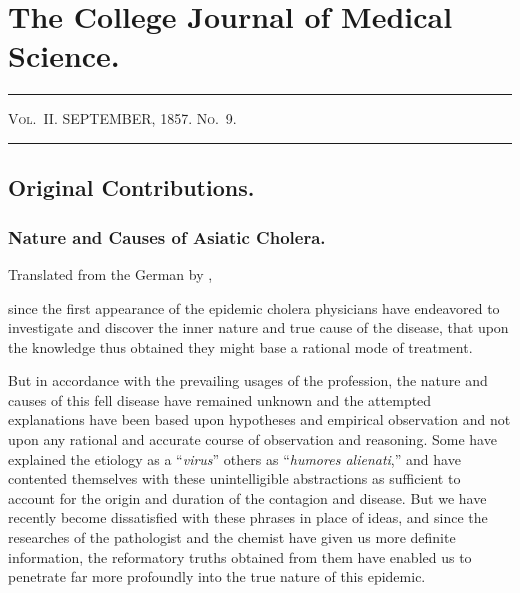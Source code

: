 \chapter*{The College Journal of Medical Science.}

\hrule\vspace{0.2em}
\footnotesize\textsc{Vol.~II.}\hfill
\normalsize{}SEPTEMBER, 1857.\hfill
\footnotesize\textsc{No.~9.}
\vspace{0.2em}\hrule

\section*{Original Contributions.}

\subsection*{Nature and Causes of Asiatic Cholera.}


\footnotesize
\begin{center}Translated from the German by , \md\end{center}
\normalsize

 since the first appearance of the epidemic cholera physicians
have endeavored to investigate and discover the inner nature and true
cause of the disease, that upon the knowledge thus obtained they might
base a rational mode of treatment.

But in accordance with the prevailing usages of the profession, the
nature and causes of this fell disease have remained unknown and the
attempted explanations have been based upon hypotheses and empirical
observation and not upon any rational and accurate course of
observation and reasoning. Some have explained the etiology as
a ``\textit{virus}'' others as ``\textit{humores alienati},'' and have contented themselves
with these unintelligible abstractions as sufficient to account for
the origin and duration of the contagion and disease. But we have
recently become dissatisfied with these phrases in place of ideas, and
since the researches of the pathologist and the chemist have given us
more definite information, the reformatory truths obtained from them
have enabled us to penetrate far more profoundly into the true nature
of this epidemic.
\endinput